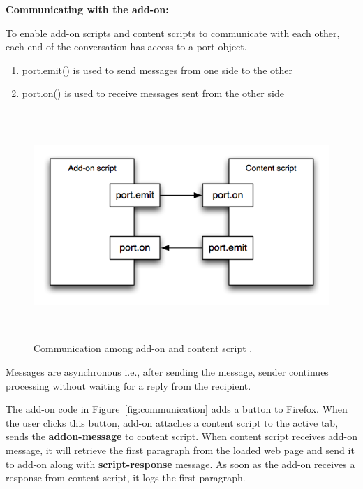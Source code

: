 \textbf{Communicating with the add-on:}

To enable add-on scripts and content scripts to communicate with each other, each end of the conversation has access to a port object.
\begin{enumerate}
\item port.emit() is used to send messages from one side to the other 
\item port.on() is used to receive messages sent from the other side
\end{enumerate}

\begin{figure}
  \centering
      \includegraphics[width=16cm, height=8.65cm]{content-scripting-overview.png}
    \caption[Communication among add-on and content script]{Communication among add-on and content script \cite{bib1}.}
    \label{fig:content-scripting-overview}
\end{figure}

Messages are asynchronous i.e., after sending the message, sender continues processing without waiting for a reply from the recipient.

The add-on code in Figure~\ref{fig:communication} adds a button to Firefox. When the user clicks this button, add-on attaches a content script to the active tab, sends the \textbf{addon-message} to content script. When content script receives add-on message, it will retrieve the first paragraph from the loaded web page and send it to add-on along with \textbf{script-response} message. As soon as the add-on receives a response from content script, it logs the first paragraph.

